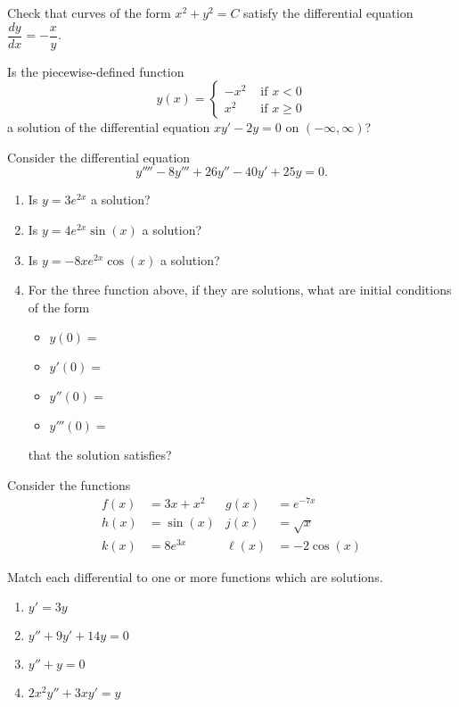 \begin{exercises}
	\begin{problist}
	\prob Check that curves of the form $x^2 + y^2 = C$ satisfy the differential equation $\dfrac{dy}{dx} = -\dfrac{x}{y}$.
	
	
	\prob Is the piecewise-defined function
	$$
	y(x) = \begin{cases}
 		-x^2 & \text{ if } x< 0 \\
 		x^2 & \text{ if } x \geq 0		
	\end{cases}
	$$
	a solution of the differential equation $xy'-2y=0$ on $(-\infty,\infty)$?
	
	
	\prob Consider the differential equation
	$$ y'''' - 8y''' + 26 y'' - 40y'+25y=0.$$
	
	\begin{enumerate}
		\item Is $y=3e^{2x}$ a solution?
		\item Is $y=4 e^{2x}\sin(x)$ a solution?
		\item Is $y=-8 x e^{2x}\cos(x)$ a solution?
		\item For the three function above, if they are solutions, what are initial conditions of the form
			\begin{itemize}
				 \item[] $y(0) =$
				 \item[] $y'(0) =$
				 \item[] $y''(0) =$
				 \item[] $y'''(0) =$
			\end{itemize}
			that the solution satisfies?
	\end{enumerate}


	\prob Consider the functions
	\begin{align*}
		f(x) & = 3x + x^2 	& g(x) & = e^{-7x} \\
		h(x) & = \sin(x) 	& j(x) & = \sqrt{x} \\
		k(x) & = 8 e^{3x}	& \ell(x) & = -2 \cos(x)
	\end{align*}
	
	Match each differential to one or more functions which are solutions.
	
	\begin{enumerate}
		\item $y'=3y$
		\item $y''+9y'+14y=0$
		\item $y''+y=0$
		\item $2x^2y'' + 3xy'=y$
	\end{enumerate}
	

\end{problist}
\end{exercises}
